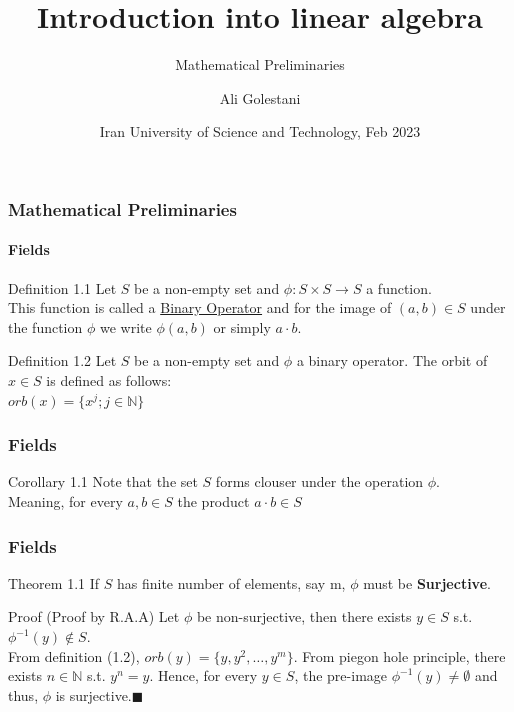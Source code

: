 \documentclass{beamer}
\title[Linear Algebra 101] %
{Introduction into linear algebra}
\subtitle{Mathematical Preliminaries}
\author[Golestani, Ali]{Ali Golestani}
\institute[IUST] %
{
  \inst{}%
  Department of Mathematics\\
  Iran University of Science and Technology
}
\date[IUST 2023] %
{Iran University of Science and Technology, Feb 2023}
\begin{document}
\frame{\titlepage}

\begin{frame}
    \frametitle{Mathematical Preliminaries}
\framesubtitle{Fields}

\begin{block}{Definition 1.1}
    Let $S$ be a non-empty set and $\phi : S \times S \rightarrow S$ a function.\\
    This function is called a \underline{Binary Operator} and for the image of $(a,b) \in S$ under the function $\phi$ we write $\phi (a,b)$
    or simply $a \cdot b$.
\end{block}

\begin{block}{Definition 1.2}
    Let $S$ be a non-empty set and $\phi$ a binary operator. The orbit of $x \in S$ is defined as follows:\\
    $orb(x) = \{x^j; j \in \mathbb{N}\}$ 
\end{block}

\end{frame}

\begin{frame}
    \frametitle{Fields}

    \begin{alertblock}{Corollary 1.1}
        Note that the set $S$ forms clouser under the operation $\phi$.\\
        Meaning, for every $a,b \in S$ the product $a \cdot b \in S$
    \end{alertblock}
\end{frame}

\begin{frame}
    \frametitle{Fields}

    \begin{block}{Theorem 1.1}
        If $S$ has finite number of elements, say m, $\phi$ must be \textbf{Surjective}.
    \end{block}

    \begin{alertblock}{Proof}
        (Proof by R.A.A) Let $\phi$ be non-surjective, then there exists $y \in S$ s.t. $\phi^{-1}(y) \notin S$.\\
        From definition (1.2), $orb(y) = \{y, y^2, \dots, y^m \}$. From piegon hole principle, there exists $n \in \mathbb{N}$ s.t. $y^n = y$.
        Hence, for every $y \in S$, the pre-image $\phi^{-1}(y) \neq \emptyset$ and thus, $\phi$ is surjective.$\blacksquare$
    \end{alertblock}

\end{frame}
\end{document}
